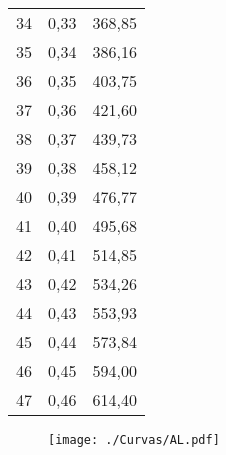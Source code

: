 \documentclass[]{article}
\begin{document}
\begin{longtable}[t]{ccc}
34 & 0,33 & 368,85\\
35 & 0,34 & 386,16\\
36 & 0,35 & 403,75\\
37 & 0,36 & 421,60\\
38 & 0,37 & 439,73\\
39 & 0,38 & 458,12\\
40 & 0,39 & 476,77\\
41 & 0,40 & 495,68\\
42 & 0,41 & 514,85\\
43 & 0,42 & 534,26\\
44 & 0,43 & 553,93\\
45 & 0,44 & 573,84\\
46 & 0,45 & 594,00\\
47 & 0,46 & 614,40\\*
\end{longtable}

\clearpage

\begin{sidewaysfigure}[htb]
   \centering
   \texttt{[image: ./Curvas/AL.pdf]}
\end{sidewaysfigure}

\clearpage
\end{document}
